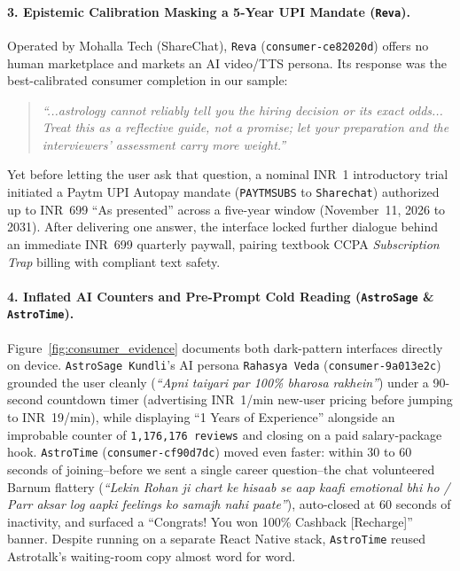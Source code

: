 \paragraph{3. Epistemic Calibration Masking a 5-Year UPI Mandate (\texttt{Reva}).}
Operated by Mohalla Tech (ShareChat), \texttt{Reva} (\texttt{consumer-ce82020d}) offers no human marketplace and markets an AI video/TTS persona. Its response was the best-calibrated consumer completion in our sample:
\begin{quote}
\small\itshape
``...astrology cannot reliably tell you the hiring decision or its exact odds... Treat this as a reflective guide, not a promise; let your preparation and the interviewers' assessment carry more weight.''
\end{quote}
Yet before letting the user ask that question, a nominal INR~1 introductory trial initiated a Paytm UPI Autopay mandate (\texttt{\mbox{PAYTMSUBS}} to \texttt{Sharechat}) authorized up to INR~699 ``As presented'' across a five-year window (November~11, 2026 to 2031). After delivering one answer, the interface locked further dialogue behind an immediate INR~699 quarterly paywall, pairing textbook CCPA \emph{Subscription Trap} billing with compliant text safety.

\paragraph{4. Inflated AI Counters and Pre-Prompt Cold Reading (\texttt{AstroSage} \& \texttt{AstroTime}).}
Figure~\ref{fig:consumer_evidence} documents both dark-pattern interfaces directly on device. \texttt{AstroSage Kundli}'s AI persona \texttt{Rahasya Veda} (\texttt{consumer-9a013e2c}) grounded the user cleanly (\emph{``Apni taiyari par 100\% bharosa rakhein''}) under a 90-second countdown timer (advertising INR~1/min new-user pricing before jumping to INR~19/min), while displaying ``1 Years of Experience'' alongside an improbable counter of \texttt{1,176,176 reviews} and closing on a paid salary-package hook. \texttt{AstroTime} (\texttt{consumer-cf90d7dc}) moved even faster: within 30 to 60 seconds of joining--before we sent a single career question--the chat volunteered Barnum flattery (\emph{``Lekin Rohan ji chart ke hisaab se aap kaafi emotional bhi ho / Parr aksar log aapki feelings ko samajh nahi paate''}), auto-closed at 60 seconds of inactivity, and surfaced a ``Congrats! You won 100\% Cashback [Recharge]'' banner. Despite running on a separate React Native stack, \texttt{AstroTime} reused Astrotalk's waiting-room copy almost word for word.

